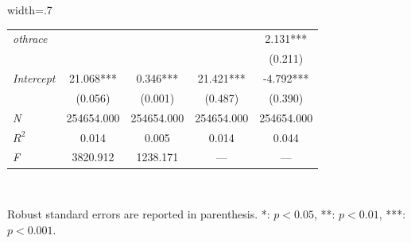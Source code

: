 \documentclass{article}
\begin{document}
\begin{table}[hp!]
\begin{adjustbox}{width=.7\textwidth}
\begin{tabular}{l|cccc|}
\multicolumn{1}{|l|}{\textit{othrace}}  &                      &                      &                      & 2.131***              \\
\multicolumn{1}{|l|}{\textit{}}         &                      &                      &                      & (0.211)               \\
\multicolumn{1}{|l|}{\textit{Intercept}}   & 21.068***            & 0.346***             & 21.421***            & -4.792***             \\
\multicolumn{1}{|l|}{\textit{}}         & (0.056)              & (0.001)              & (0.487)              & (0.390)               \\ \hline
\multicolumn{1}{|l|}{\textit{N}}        & 254654.000           & 254654.000           & 254654.000           & 254654.000            \\
\multicolumn{1}{|l|}{\textit{$R^2$}}       & 0.014                & 0.005                & 0.014                & 0.044                 \\
\multicolumn{1}{|l|}{\textit{F}}        & 3820.912             & 1238.171             & ---                  & ---                   \\ \hline
\end{tabular}
\end{adjustbox}
\\[1em]
\begin{minipage}{\textwidth} %
\footnotesize{Robust standard errors are reported in parenthesis. *: $p<0.05$, **: $p<0.01$, ***: $p<0.001$. \par}
\end{minipage}
\end{table}
\end{document}
